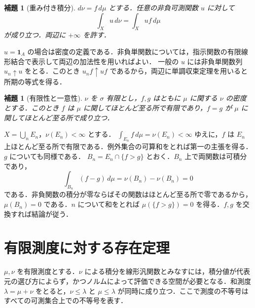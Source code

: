 \documentclass[a5paper,10pt,onecolumn]{jsarticle}
\makeatletter
\theoremstyle{mathnotetheorem}
\newtheorem{lemma}[theorem]{補題}
\renewcommand{\proofname}{証明}
\renewenvironment{proof}[1][\proofname]{%
  \par\pushQED{\qed}\normalfont\topsep4\p@\@plus2\p@\relax
  \trivlist\item[\hskip\labelsep\bfseries #1]\ignorespaces
}{\popQED\endtrivlist\@endpefalse}
\makeatother
\begin{document}
\begin{lemma}[重み付き積分]\label{lem:weight}
$d\nu=f\,d\mu$ とする．任意の非負可測関数 $u$ に対して
\[
                   \int_X u\,d\nu=\int_X uf\,d\mu
\]
が成り立つ．両辺に $+\infty$ を許す．
\end{lemma}
\begin{proof}
$u=\mathbf1_A$ の場合は密度の定義である．非負単関数については，指示関数の有限線形結合で表示して両辺の加法性を用いればよい．
一般の $u$ には非負単関数列 $u_n\uparrow u$ をとる．このとき $u_nf\uparrow uf$ であるから，両辺に単調収束定理を用いると所期の等式を得る．
\end{proof}

\begin{lemma}[有限性と一意性]\label{lem:uniq}
$\nu$ を $\sigma$ 有限とし，$f,g$ はともに $\mu$ に関する $\nu$ の密度とする．このとき $f$ は $\mu$ に関してほとんど至る所で有限であり，$f=g$ が $\mu$ に関してほとんど至る所で成り立つ．
\end{lemma}
\begin{proof}
$X=\bigcup_n E_n$，$\nu(E_n)<\infty$ とする．
$\int_{E_n} f\,d\mu=\nu(E_n)<\infty$ ゆえに，$f$ は $E_n$ 上ほとんど至る所で有限である．例外集合の可算和をとれば第一の主張を得る．$g$ についても同様である．
$B_n=E_n\cap\{f>g\}$ とおく．$B_n$ 上で両関数は可積分であり，
\[
           \int_{B_n}(f-g)\,d\mu=\nu(B_n)-\nu(B_n)=0
\]
である．非負関数の積分が零ならばその関数はほとんど至る所で零であるから，$\mu(B_n)=0$ である．$n$ について和をとれば $\mu(\{f>g\})=0$ を得る．$f,g$ を交換すれば結論が従う．
\end{proof}

\section{有限測度に対する存在定理}

$\mu,\nu$ を有限測度とする．$\nu$ による積分を線形汎関数とみなすには，積分値が代表元の選び方によらず，かつノルムによって評価できる空間が必要となる．和測度 $\lambda=\mu+\nu$ をとると，$\nu\le\lambda$ と $\mu\le\lambda$ が同時に成り立つ．ここで測度の不等号はすべての可測集合上での不等号を表す．
\end{document}
